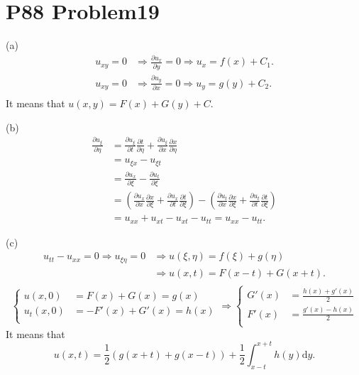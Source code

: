\documentclass[a4paper]{ctexart}
\newcommand{\dif}{\mathrm{d}}
\newcommand{\pdfFrac}[2]{\frac{\partial #1}{\partial #2}}
\begin{document}
\section*{P88 Problem19}
(a)
\begin{equation}
    \begin{aligned}
        u_{xy}=0&\Rightarrow\pdfFrac{u_{x}}{y}=0\Rightarrow u_{x}=f(x)+C_{1}.\\
        u_{xy}=0&\Rightarrow\pdfFrac{u_{y}}{x}=0\Rightarrow u_{y}=g(y)+C_{2}.\\
    \end{aligned}
\end{equation}
It means that $u(x,y)=F(x)+G(y)+C$.

(b)
\begin{equation}
    \begin{aligned}
        \pdfFrac{u_{\xi}}{\eta}&=\pdfFrac{u_{\xi}}{t}\pdfFrac{t}{\eta}+\pdfFrac{u_{\xi}}{x}\pdfFrac{x}{\eta}\\
        &=u_{\xi x}-u_{\xi t}\\
        &=\pdfFrac{u_{x}}{\xi}-\pdfFrac{u_{t}}{\xi}\\
        &=(\pdfFrac{u_{x}}{x}\pdfFrac{x}{\xi}+\pdfFrac{u_{x}}{t}\pdfFrac{t}{\xi})-(\pdfFrac{u_{t}}{x}\pdfFrac{x}{\xi}+\pdfFrac{u_{t}}{t}\pdfFrac{t}{\xi})\\
        &=u_{xx}+u_{xt}-u_{xt}-u_{tt}=u_{xx}-u_{tt}.
    \end{aligned}
\end{equation}

(c)
\begin{equation}
    \begin{aligned}
    u_{tt}-u_{xx}=0\Rightarrow u_{\xi\eta}=0&\Rightarrow u(\xi,\eta)=f(\xi)+g(\eta)\\
    &\Rightarrow u(x,t)=F(x-t)+G(x+t).\\
    \end{aligned}
\end{equation}
\begin{equation}
    \left\{
        \begin{aligned}
            u(x,0)&=F(x)+G(x)=g(x)\\
            u_{t}(x,0)&=-F'(x)+G'(x)=h(x)\\
        \end{aligned}
    \right.
    \Rightarrow
    \left\{
        \begin{aligned}
            G'(x)&=\frac{h(x)+g'(x)}{2}\\
            F'(x)&=\frac{g'(x)-h(x)}{2}\\
        \end{aligned}
    \right.
\end{equation}
It means that 
\begin{equation}
    u(x,t)=\frac{1}{2}(g(x+t)+g(x-t))+\frac{1}{2}\int_{x-t}^{x+t}h(y)\dif y.
\end{equation}
\end{document}

